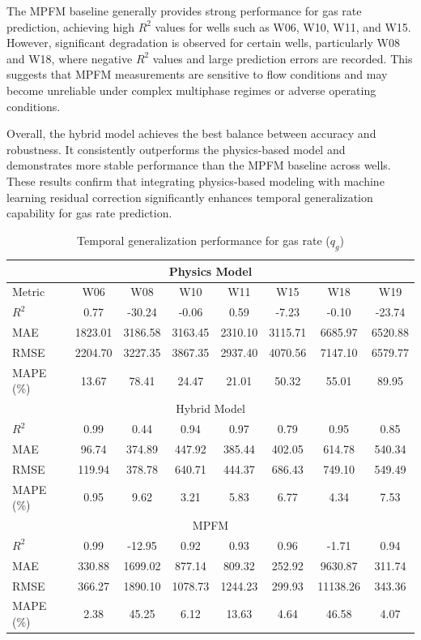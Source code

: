 \documentclass[12pt,APA]{uomthesis}
\begin{document}
The MPFM baseline generally provides strong performance for gas rate prediction, achieving high $R^2$ values for wells such as W06, W10, W11, and W15. However, significant degradation is observed for certain wells, particularly W08 and W18, where negative $R^2$ values and large prediction errors are recorded. This suggests that MPFM measurements are sensitive to flow conditions and may become unreliable under complex multiphase regimes or adverse operating conditions.

Overall, the hybrid model achieves the best balance between accuracy and robustness. It consistently outperforms the physics-based model and demonstrates more stable performance than the MPFM baseline across wells. These results confirm that integrating physics-based modeling with machine learning residual correction significantly enhances temporal generalization capability for gas rate prediction.

\begin{table}[!ht]
\centering
\caption{Temporal generalization performance for gas rate ($q_g$)}
\label{tab:temporal_gas_rate_comparison}
\begin{tabular}{lccccccc}
\hline
\hline
\multicolumn{8}{c}{Physics Model} \\
\hline
Metric & W06 & W08 & W10 & W11 & W15 & W18 & W19 \\
\hline
$R^2$ & 0.77 & -30.24 & -0.06 & 0.59 & -7.23 & -0.10 & -23.74 \\
MAE & 1823.01 & 3186.58 & 3163.45 & 2310.10 & 3115.71 & 6685.97 & 6520.88 \\
RMSE & 2204.70 & 3227.35 & 3867.35 & 2937.40 & 4070.56 & 7147.10 & 6579.77 \\
MAPE (\%) & 13.67 & 78.41 & 24.47 & 21.01 & 50.32 & 55.01 & 89.95 \\
\hline

\multicolumn{8}{c}{Hybrid Model} \\
\hline
$R^2$ & 0.99 & 0.44 & 0.94 & 0.97 & 0.79 & 0.95 & 0.85 \\
MAE & 96.74 & 374.89 & 447.92 & 385.44 & 402.05 & 614.78 & 540.34 \\
RMSE & 119.94 & 378.78 & 640.71 & 444.37 & 686.43 & 749.10 & 549.49 \\
MAPE (\%) & 0.95 & 9.62 & 3.21 & 5.83 & 6.77 & 4.34 & 7.53 \\
\hline

\multicolumn{8}{c}{MPFM} \\
\hline
$R^2$ & 0.99 & -12.95 & 0.92 & 0.93 & 0.96 & -1.71 & 0.94 \\
MAE & 330.88 & 1699.02 & 877.14 & 809.32 & 252.92 & 9630.87 & 311.74 \\
RMSE & 366.27 & 1890.10 & 1078.73 & 1244.23 & 299.93 & 11138.26 & 343.36 \\
MAPE (\%) & 2.38 & 45.25 & 6.12 & 13.63 & 4.64 & 46.58 & 4.07 \\
\hline
\end{tabular}
\end{table}
\end{document}
